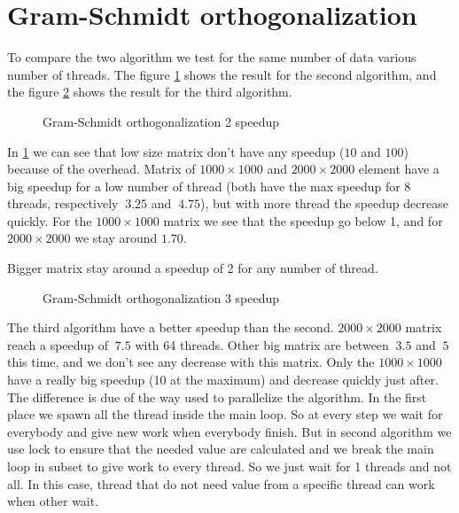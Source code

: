 \section{Gram-Schmidt orthogonalization}

To compare the two algorithm we test for the same number of data various number of threads. The figure \ref{fig:gram2} shows the result for the second algorithm, and the figure \ref{fig:gram3} shows the result for the third algorithm.\\

\begin{figure}[!h]
  \begin{center}
  \end{center}
  \caption{Gram-Schmidt orthogonalization 2 speedup}
  \label{fig:gram2}
\end{figure}

In \ref{fig:gram2} we can see that low size matrix don't have any speedup ($10$ and $100$) because of the overhead.
Matrix of $1000\times 1000$ and  $2000\times 2000$ element have a big speedup for a low number of thread (both have the max speedup for 8 threads, respectively $~3.25$ and $~4.75$), but with more thread the speedup decrease quickly. For the $1000\times 1000$ matrix we see that the speedup go below 1, and for $2000\times 2000$ we stay around $1.70$.

Bigger matrix stay around a speedup of 2 for any number of thread.\\

\begin{figure}[!h]
  \begin{center}
  \end{center}
  \caption{Gram-Schmidt orthogonalization 3 speedup}
  \label{fig:gram3}
\end{figure}

The third algorithm have a better speedup than the second.  $2000\times 2000$ matrix reach a speedup of $~7.5$ with 64 threads. Other big matrix are between $~3.5$ and $~5$ this time, and we don't see any decrease with this matrix. Only the $1000\times 1000$ have a really big speedup (10 at the maximum) and decrease quickly just after.\\

The difference is due of the way used to parallelize the algorithm.
In the first place we spawn all the thread inside the main loop.
So at every step we wait for everybody and give new work when everybody finish.
But in second algorithm we use lock to ensure that the needed value are calculated and we break the main loop in subset to give work to every thread.
So we just wait for 1 threads and not all. In this case, thread that do not need value from a specific thread can work when other wait.

